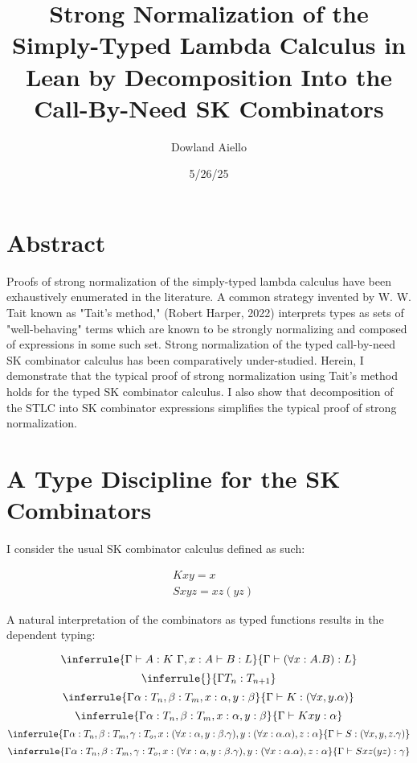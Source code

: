 \documentclass[11pt]{article}
\author{Dowland Aiello}
\date{5/26/25}
\title{Strong Normalization of the Simply-Typed Lambda Calculus in Lean by Decomposition Into the Call-By-Need SK Combinators}
\begin{document}
\maketitle
\tableofcontents

\section{Abstract}
\label{sec:org2aa03f6}

Proofs of strong normalization of the simply-typed lambda calculus have been exhaustively enumerated in the literature. A common strategy invented by W. W. Tait known as "Tait's method," (Robert Harper, 2022) interprets types as sets of "well-behaving" terms which are known to be strongly normalizing and composed of expressions in some such set.
Strong normalization of the typed call-by-need SK combinator calculus has been comparatively under-studied. Herein, I demonstrate that the typical proof of strong normalization using Tait's method holds for the typed SK combinator calculus. I also show that decomposition of the STLC into SK combinator expressions simplifies the typical proof of strong normalization.
\section{A Type Discipline for the SK Combinators}
\label{sec:org5ab1a73}

I consider the usual SK combinator calculus defined as such:

\begin{align}
& K xy = x \\
& S xyz = xz (yz)
\end{align}

A natural interpretation of the combinators as typed functions results in the dependent typing:

\label{inference:1}

\[
\inferrule
  { \Gamma \vdash A : K \ \Gamma,x : A \vdash B : L }
  { \Gamma \vdash (\forall x : A.B) : L}
\]
\[
\inferrule
  { }
  { \Gamma T_{n} : T_{n + 1} }
\]
\[
\inferrule
  { \Gamma \alpha : T_{n}, \beta : T_{m}, x : \alpha, y : \beta }
  { \Gamma \vdash K : (\forall x, y.\alpha) }
\]
\[
\inferrule
  { \Gamma \alpha : T_{n}, \beta : T_{m}, x : \alpha, y : \beta }
  { \Gamma \vdash K x y : \alpha }
\]
\[
\inferrule
  { \Gamma \alpha : T_{n}, \beta : T_{m}, \gamma : T_{o}, x : (\forall x : \alpha, y : \beta.\gamma), y : (\forall x : \alpha.\alpha), z : \alpha }
  { \Gamma \vdash S : (\forall x, y, z.\gamma) }
\]
\[
\inferrule
  { \Gamma \alpha : T_{n}, \beta : T_{m}, \gamma : T_{o}, x : (\forall x : \alpha, y : \beta.\gamma), y : (\forall x : \alpha.\alpha), z : \alpha }
  { \Gamma \vdash S x z (y z) : \gamma }
\]
\end{document}
